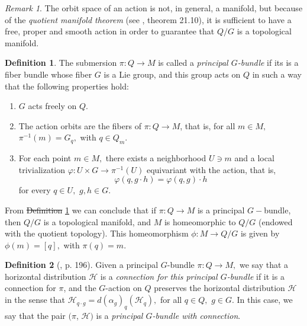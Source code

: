 \documentclass[12pt, letterpaper, reqno]{amsart}
\theoremstyle{definition}
\newtheorem{df}{Definition}
\theoremstyle{plain}
\theoremstyle{remark}
\newtheorem{rem}{Remark}
\providecommand{\DIFadd}[1]{{\protect\color{blue}\uwave{#1}}} %
\providecommand{\DIFdel}[1]{{\protect\color{red}\sout{#1}}}                      %
\providecommand{\DIFaddbegin}{} %
\providecommand{\DIFaddend}{} %
\providecommand{\DIFdelbegin}{} %
\providecommand{\DIFdelend}{} %
\newcommand{\DIFscaledelfig}{0.5}
\newlength{\DIFdelgraphicswidth} %
\newlength{\DIFdelgraphicsheight} %
\newcommand{\DIFaddincludegraphics}[2][]{{\color{blue}\fbox{\DIFOincludegraphics[#1]{#2}}}} %
\newcommand{\DIFdelincludegraphics}[2][]{%
\sbox{\DIFdelgraphicsbox}{\DIFOincludegraphics[#1]{#2}}%
\settoboxwidth{\DIFdelgraphicswidth}{\DIFdelgraphicsbox} %
\settoboxtotalheight{\DIFdelgraphicsheight}{\DIFdelgraphicsbox} %
\scalebox{\DIFscaledelfig}{%
\parbox[b]{\DIFdelgraphicswidth}{\usebox{\DIFdelgraphicsbox}\\[-\baselineskip] \rule{\DIFdelgraphicswidth}{0em}}\llap{\resizebox{\DIFdelgraphicswidth}{\DIFdelgraphicsheight}{%
\setlength{\unitlength}{\DIFdelgraphicswidth}%
\begin{picture}(1,1)%
\thicklines\linethickness{2pt} %
{\color[rgb]{1,0,0}\put(0,0){\framebox(1,1){}}}%
{\color[rgb]{1,0,0}\put(0,0){\line( 1,1){1}}}%
{\color[rgb]{1,0,0}\put(0,1){\line(1,-1){1}}}%
\end{picture}%
}\hspace*{3pt}}} %
} %
\DeclareRobustCommand{\DIFaddbegin}{\DIFOaddbegin \let\includegraphics\DIFaddincludegraphics} %
\DeclareRobustCommand{\DIFaddend}{\DIFOaddend \let\includegraphics\DIFOincludegraphics} %
\DeclareRobustCommand{\DIFdelbegin}{\DIFOdelbegin \let\includegraphics\DIFdelincludegraphics} %
\DeclareRobustCommand{\DIFdelend}{\DIFOaddend \let\includegraphics\DIFOincludegraphics} %
\begin{document}
\begin{rem}
The orbit space of an action is not, in general, a manifold, but because of the \textit{quotient manifold theorem} (see \cite{lee2003introduction}, theorem 21.10), it is sufficient to have a free, proper and smooth action in order to guarantee that $ Q/G $ is a topological manifold.
\end{rem}
\begin{df}\label{df:principalGbundle}
	The submersion $ \pi: Q \rightarrow M$  is called a \textit{principal $ G $-bundle} if its is a fiber bundle whose fiber $ G $ is a Lie group, and this group acts on $ Q $ in such a way that the following properties hold:
	\begin{enumerate}
		\item $ G $ acts freely on $ Q $.
		\item The action orbits are the fibers of $ \pi:Q \rightarrow {M} $, that is, for all $ m\in M, $ $ \pi^{-1}(m) = G_q, $ with $ q\in Q_m. $ 
		\item For each point $ m\in M, $ there exists a neighborhood $ U\ni m $ and a local trivialization $ \varphi: U\times G \rightarrow \pi^{-1}(U)$ equivariant with the action, that is,
			$$ \varphi(q, g\cdot h)=\varphi(q,g)\cdot h  $$ 
			for every $ q\in U, $ $ g,h\in G. $ 
	\end{enumerate}
\end{df}

From \DIFdelbegin \DIFdel{Definition }\DIFdelend \DIFaddbegin \DIFadd{definition }\DIFaddend \ref{df:principalGbundle} we can conclude that if $ \pi: Q \rightarrow M $ is a principal $ G- $bundle, then $Q/G  $ is a topological manifold, and $M $ is homeomorphic to $ Q/G $ (endowed with the quotient topology). This homeomorphism $ \phi: M \rightarrow {Q/G}$  is given by $ \phi(m)=[q], $ with $ \pi(q)=m. $ 

\begin{df}[\cite{montgomery2002tour}, p. 196]
	Given a principal $ G $-bundle $ \pi: Q \rightarrow M, $ we say that a horizontal distribution $ \mathcal{H} $ is a \textit{connection for this principal $ G $-bundle} if it is a connection for $ \pi $, and the $ G $-action on $ Q $ preserves the horizontal distribution $ \mathcal{H} $ in the sense that $ \mathcal{H}_{q\cdot g} = d(\alpha_g)_q (\mathcal{H}_q), $ for all $ q\in Q, $ $ g\in G $. In this case, we say that the pair $ (\pi$, $ \mathcal{H}) $ is a \textit{principal $ G $-bundle with connection}. 

\end{df}
\end{document}
